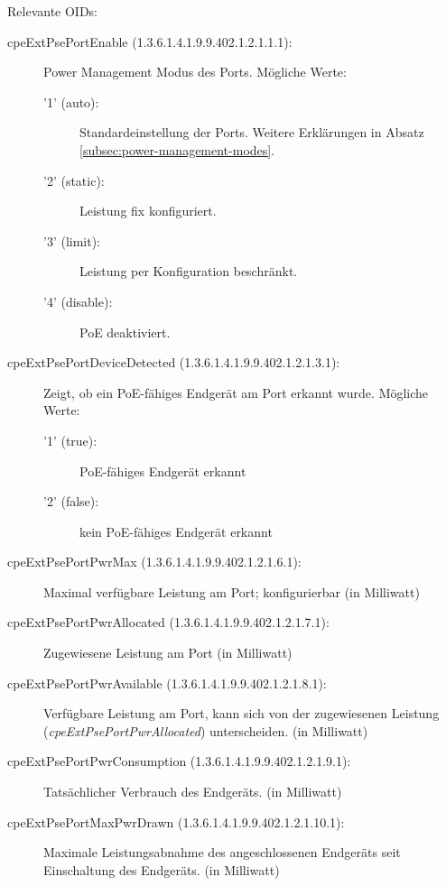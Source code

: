 Relevante OIDs:
\begin{description}
\item[cpeExtPsePortEnable (1.3.6.1.4.1.9.9.402.1.2.1.1.1):] Power Management Modus des Ports.
M\"ogliche Werte:
\begin{description}
\item ['1' (auto):] Standardeinstellung der Ports. Weitere Erkl\"arungen in Absatz \ref{subsec:power-management-modes}.
\item ['2' (static):] Leistung fix konfiguriert.
\item ['3' (limit):] Leistung per Konfiguration beschr\"ankt.
\item ['4' (disable):] PoE deaktiviert.
\end{description}

\item[cpeExtPsePortDeviceDetected (1.3.6.1.4.1.9.9.402.1.2.1.3.1):] Zeigt, ob ein PoE-f\"ahiges Endger\"at am Port erkannt wurde.
M\"ogliche Werte:
\begin{description}
\item ['1' (true):] PoE-f\"ahiges Endger\"at erkannt
\item ['2' (false):] kein PoE-f\"ahiges Endger\"at erkannt
\end{description}

\item[cpeExtPsePortPwrMax (1.3.6.1.4.1.9.9.402.1.2.1.6.1):] Maximal verf\"ugbare Leistung am Port; konfigurierbar (in Milliwatt)
\item[cpeExtPsePortPwrAllocated (1.3.6.1.4.1.9.9.402.1.2.1.7.1):] Zugewiesene Leistung am Port (in Milliwatt)
\item[cpeExtPsePortPwrAvailable (1.3.6.1.4.1.9.9.402.1.2.1.8.1):] Verf\"ugbare Leistung am Port, kann sich von der zugewiesenen Leistung (\emph{cpeExtPsePortPwrAllocated}) unterscheiden. (in Milliwatt)
\item[cpeExtPsePortPwrConsumption (1.3.6.1.4.1.9.9.402.1.2.1.9.1):] Tats\"achlicher Verbrauch des Endger\"ats. (in Milliwatt)
\item[cpeExtPsePortMaxPwrDrawn (1.3.6.1.4.1.9.9.402.1.2.1.10.1):] Maximale Leistungsabnahme des angeschlossenen Endger\"ats seit Einschaltung des Endger\"ats. (in Milliwatt)

\end{description}





